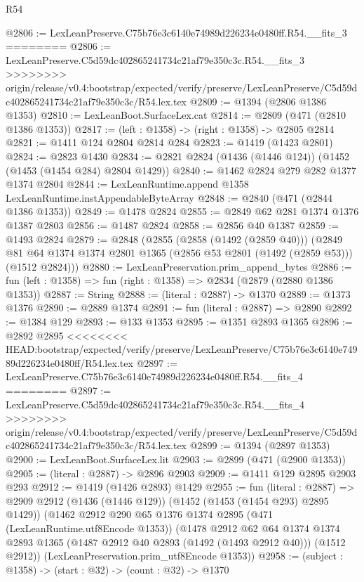 \begin{lexlean}{R54}
\begin{coremodule}
{{{{{{{{{{{{{{{{{{{{{{{{{{{{{{{{{{{{{{{{{{{{{{{{{{@2806 := LexLeanPreserve.C75b76e3c6140e74989d226234e0480ff.R54.__fits_3
========
@2806 := LexLeanPreserve.C5d59dc402865241734c21af79e350c3c.R54.__fits_3
>>>>>>>> origin/release/v0.4:bootstrap/expected/verify/preserve/LexLeanPreserve/C5d59dc402865241734c21af79e350c3c/R54.lex.tex
@2809 := @1394 (@2806 @1386 @1353)
@2810 := LexLeanBoot.SurfaceLex.cat
@2814 := @2809 (@471 (@2810 @1386 @1353))
@2817 := (left : @1358) -> (right : @1358) -> @2805 @2814
@2821 := @1411 @124 @2804 @2814 @284
@2823 := @1419 (@1423 @2801)
@2824 := @2823 @1430
@2834 := @2821 @2824 (@1436 (@1446 @124)) (@1452 (@1453 (@1454 @284) @2804 @1429))
@2840 := @1462 @2824 @279 @282 @1377 @1374 @2804
@2844 := LexLeanRuntime.append @1358 LexLeanRuntime.instAppendableByteArray
@2848 := @2840 (@471 (@2844 @1386 @1353))
@2849 := @1478 @2824
@2855 := @2849 @62 @281 @1374 @1376 @1387 @2803
@2856 := @1487 @2824
@2858 := @2856 @40 @1387
@2859 := @1493 @2824
@2879 := @2848
    (@2855
      (@2858 (@1492 (@2859 @40)))
      (@2849 @81 @64 @1374 @1374 @2801 @1365 (@2856 @53 @2801 (@1492 (@2859 @53))) (@1512 @2824)))
@2880 := LexLeanPreservation.prim_append_bytes
@2886 := fun (left : @1358) => fun (right : @1358) => @2834 (@2879 (@2880 @1386 @1353))
@2887 := String
@2888 := (literal : @2887) -> @1370
@2889 := @1373 @1376
@2890 := @2889 @1374
@2891 := fun (literal : @2887) => @2890
@2892 := @1384 @129
@2893 := @133 @1353
@2895 := @1351 @2893 @1365
@2896 := @2892 @2895
<<<<<<<< HEAD:bootstrap/expected/verify/preserve/LexLeanPreserve/C75b76e3c6140e74989d226234e0480ff/R54.lex.tex
@2897 := LexLeanPreserve.C75b76e3c6140e74989d226234e0480ff.R54.__fits_4
========
@2897 := LexLeanPreserve.C5d59dc402865241734c21af79e350c3c.R54.__fits_4
>>>>>>>> origin/release/v0.4:bootstrap/expected/verify/preserve/LexLeanPreserve/C5d59dc402865241734c21af79e350c3c/R54.lex.tex
@2899 := @1394 (@2897 @1353)
@2900 := LexLeanBoot.SurfaceLex.lit
@2903 := @2899 (@471 (@2900 @1353))
@2905 := (literal : @2887) -> @2896 @2903
@2909 := @1411 @129 @2895 @2903 @293
@2912 := @1419 (@1426 @2893) @1429
@2955 := fun (literal : @2887) =>
  @2909
    @2912
    (@1436 (@1446 @129))
    (@1452 (@1453 (@1454 @293) @2895 @1429))
    (@1462
      @2912
      @290
      @65
      @1376
      @1374
      @2895
      (@471 (LexLeanRuntime.utf8Encode @1353))
      (@1478
        @2912
        @62
        @64
        @1374
        @1374
        @2893
        @1365
        (@1487 @2912 @40 @2893 (@1492 (@1493 @2912 @40)))
        (@1512 @2912))
      (LexLeanPreservation.prim_utf8Encode @1353))
@2958 := (subject : @1358) -> (start : @32) -> (count : @32) -> @1370
}}}}}}}}}}}}}}}}}}}}}}}}}}}}}}}}}}}}}}}}}}}}}}}}}}
\end{coremodule}
\end{lexlean}
